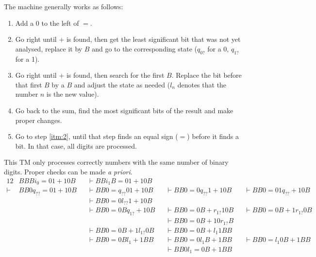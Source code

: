 \documentclass[docid=TP11]{tcom_TP}
\begin{document}
{\begin{center}
\end{center}
The machine generally works as follows:
\begin{enumerate}
	\item Add a $0$ to the left of $=$.
	\item \label{itm:2} Go right until $+$ is found, then get the least significant bit that was not yet analysed, replace it by $B$ and go to the corresponding state ($q_{0?}$ for a 0, $q_{1?}$ for a 1).
	\item Go right until $+$ is found, then search for the first $B$. Replace the bit before that first $B$ by a $B$ and adjust the state as needed ($l_n$ denotes that the number $n$ is the new value).
	\item Go back to the sum, find the most significant bits of the result and make proper changes.
	\item Go to step \ref{itm:2}, until that step finds an equal sign ($=$) before it finds a bit. In that case, all digits are processed.
\end{enumerate}
This TM only processes correctly numbers with the same number of binary digits. Proper checks can be made \textit{a priori}.
\begin{alignat*}{12}
	       & BBB i_0 =01+10B    &&\vdash BB i_1 B=01+10B    && \\
	\vdash & BB0 q_{??} =01+10B &&\vdash BB0= q_{??} 01+10B &&\vdash BB0=0 q_{??} 1+10B &&\vdash BB0=01 q_{??} +10B &&\\
	       &                    &&\vdash BB0=0 l_{??} 1+10B &&\\
		   &                    &&\vdash BB0=0B q_{1?} +10B &&\vdash BB0=0B+ r_{1?} 10B &&\vdash BB0=0B+1 r_{1?} 0B &&\\
		   &                    &&                          &&\vdash BB0=0B+10 r_{1?} B &&\\
		   &                    &&\vdash BB0=0B+1 l_{1?} 0B &&\vdash BB0=0B+ l_{1 } 1BB &&\\
		   &                    &&\vdash BB0=0B l_{1 } +1BB &&\vdash BB0=0 l_{1 } B+1BB &&\vdash BB0= l_{1 } 0B+1BB &&\\
		   &                    &&                          &&\vdash BB0 l_{1 } =0B+1BB &&\\

\end{alignat*}}
\end{document}
